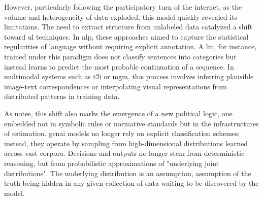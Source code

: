 However, particularly following the participatory turn of the internet, as the volume and heterogeneity of data exploded, this model quickly revealed its limitations. The need to extract structure from unlabeled data catalyzed a shift toward \gls{ul} techniques. In \gls{nlp}, these approaches aimed to capture the statistical regularities of language without requiring explicit annotation. A \gls{lm}, for instance, trained under this paradigm does not classify sentences into categories but instead learns to predict the most probable continuation of a sequence. In multimodal systems such as \gls{t2i} or \gls{mgm}, this process involves inferring plausible image-text correspondences or interpolating visual representations from distributed patterns in training data.

As \textcite[3]{amoore2024} notes, this shift also marks the emergence of a new political logic, one embedded not in symbolic rules or normative standards but in the infrastructures of estimation. \gls{genai} models no longer rely on explicit classification schemes; instead, they operate by sampling from high-dimensional distributions learned across vast corpora. Decisions and outputs no longer stem from deterministic reasoning, but from probabilistic approximations of "underlying joint distributions". The underlying distribution is an assumption, assumption of the truth being hidden in any given collection of data waiting to be discovered by the model.


